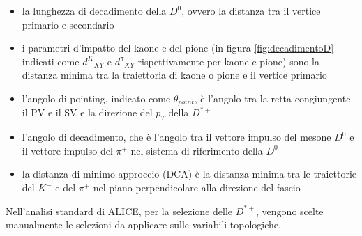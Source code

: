     \begin{itemize}
        \item la lunghezza di decadimento della $D^0$, ovvero la distanza tra il vertice primario e secondario
        \item i parametri d'impatto del kaone e del pione (in figura \ref{fig:decadimentoD} indicati come ${d^K}_{XY}$ e ${d^\pi}_{XY}$ rispettivamente per kaone e pione) sono la distanza minima tra la traiettoria di kaone o pione e il vertice primario
        \item l'angolo di pointing, indicato come $\theta_{point}$, \`e l'angolo tra la retta congiungente il PV e il SV e la direzione del $p_T$ della $D^{*+}$
        \item l'angolo di decadimento, che \`e l'angolo tra il vettore impulso del mesone $D^0$ e il vettore impulso del $\pi^+$ nel sistema di riferimento della $D^0$
        \item la distanza di minimo approccio (DCA) \`e la distanza minima tra le traiettorie del $K^-$ e del $\pi^+$ nel piano perpendicolare alla direzione del fascio
    \end{itemize}{}

Nell'analisi standard di ALICE, per la selezione delle $D^{*+}$, vengono scelte manualmente le selezioni da applicare sulle variabili topologiche. 






